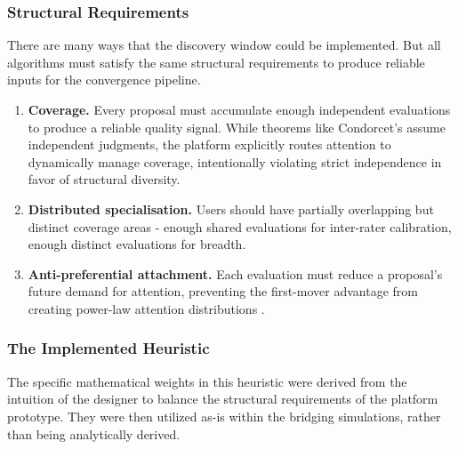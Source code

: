 \documentclass[a4paper, 12pt, twoside]{iviathesis}
\begin{document}
\subsubsection{Structural Requirements}
\label{sec:structural-requirements}
There are many ways that the discovery window could be implemented. But all algorithms must satisfy the same structural requirements to produce reliable inputs for the convergence pipeline. 
\begin{enumerate}
    \item \textbf{Coverage.} Every proposal must accumulate enough independent evaluations to produce a reliable quality signal. While theorems like Condorcet's \cite{condorcet1785, austensmith1996} assume independent judgments, the platform explicitly routes attention to dynamically manage coverage, intentionally violating strict independence in favor of structural diversity. 
    
    \item \textbf{Distributed specialisation.} Users should have partially overlapping but distinct coverage areas - enough shared evaluations for inter-rater calibration, enough distinct evaluations for breadth.
    \item \textbf{Anti-preferential attachment.} Each evaluation must reduce a proposal's future demand for attention, preventing the first-mover advantage from creating power-law attention distributions \cite{barabasi1999}.
\end{enumerate}


\subsubsection{The Implemented Heuristic}
The specific mathematical weights in this heuristic were derived from the intuition of the designer to balance the structural requirements of the platform prototype. They were then utilized as-is within the bridging simulations, rather than being analytically derived.
\end{document}
